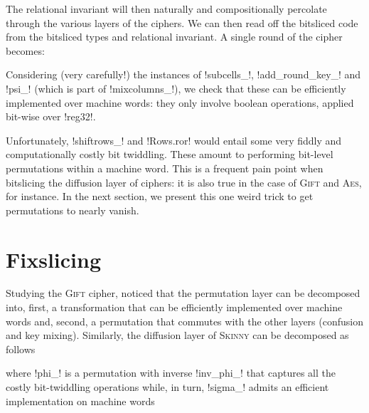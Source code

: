 \documentclass[draft,english]{jflart}
\newcommand{\Skinny}{\textsc{Skinny}}
\newcommand{\Gift}{\textsc{Gift}}
\newcommand{\AES}{\textsc{Aes}}
\begin{document}
The relational invariant will then naturally and compositionally
percolate through the various layers of the ciphers. We can then read
off the bitsliced code from the bitsliced types and relational
invariant. A single round of the cipher becomes:
%


Considering (very carefully!) the instances of \coqe!subcells_!,
\coqe!add_round_key_! and \coqe!psi_! (which is part of
\coqe!mixcolumns_!), we check that these can be efficiently
implemented over machine words: they only involve boolean operations,
applied bit-wise over \coqe!reg32!.

Unfortunately, \coqe!shiftrows_! and \coqe!Rows.ror! would entail some
very fiddly and computationally costly bit twiddling. These amount to
performing bit-level permutations within a machine word. This is a
frequent pain point when bitslicing the diffusion layer of ciphers: it
is also true in the case of \Gift{} and \AES{}, for instance. In the
next section, we present this one weird trick to get permutations to
nearly vanish.

\section{Fixslicing}
\label{sec:fixslicing}




Studying the \Gift{} cipher, \citet{adominicai:fixslicing-gift} noticed that the
permutation layer can be decomposed into, first, a transformation that
can be efficiently implemented over machine words and, second, a
permutation that commutes with the other layers (confusion and key
mixing). Similarly, the diffusion layer of \Skinny{} can be decomposed as
follows
%
\begin{prop}
\end{prop}
%
%
where \coqe!phi_! is a permutation with inverse \coqe!inv_phi_! that
captures all the costly bit-twiddling operations
%
%
%
while, in turn, \coqe!sigma_! admits an efficient implementation on
machine words
%
\end{document}
